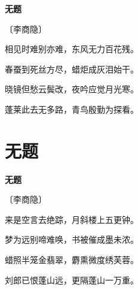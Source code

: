 \documentclass[12pt,UTF-8,openany,fontset=none]{ctexbook}
\begin{document}

\begin{center}
    {\bfseries 无题}

    \vspace{18pt}

    \begin{large}\xuwen
        〔李商隐〕
    \end{large}

\end{center}

    \vspace{18pt}

\begin{center}
    \begin{Large}

        相见时难别亦难，东风无力百花残。

        春蚕到死丝方尽，蜡炬成灰泪始干。

        晓镜但愁云鬓改，夜吟应觉月光寒。

        蓬莱此去无多路，青鸟殷勤为探看。

    \end{Large}

\end{center}

\vspace{8pt}
\clearpage

\section{无题}


\begin{center}
    {\bfseries 无题}

    \vspace{18pt}

    \begin{large}\xuwen
        〔李商隐〕
    \end{large}

\end{center}

    \vspace{18pt}

\begin{center}
    \begin{Large}

        来是空言去绝踪，月斜楼上五更钟。

        梦为远别啼难唤，书被催成墨未浓。

        蜡照半笼金翡翠，麝熏微度绣芙蓉。

        刘郎已恨蓬山远，更隔蓬山一万重。

    \end{Large}

\end{center}
\end{document}
